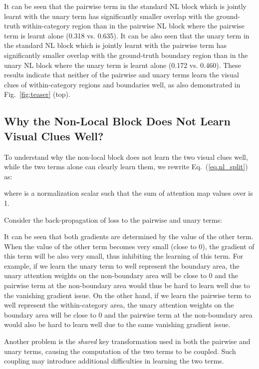 \documentclass[runningheads]{llncs}
\begin{document}
It can be seen that the pairwise term in the standard NL block which is jointly learnt with the unary term has significantly smaller overlap with the ground-truth within-category region than in the pairwise NL block where the pairwise term is learnt alone (0.318 vs. 0.635). It can be also seen that the unary term in the standard NL block which is jointly learnt with the pairwise term has significantly smaller overlap with the ground-truth boundary region than in the unary NL block where the unary term is learnt alone (0.172 vs. 0.460). These results indicate that neither of the pairwise and unary terms learn the visual clues of within-category regions and boundaries well, as also demonstrated in Fig.~\ref{fig:teaser} (top).

\subsection{Why the Non-Local Block Does Not Learn Visual Clues Well?}

To understand why the non-local block does not learn the two visual clues well, while the two terms alone can clearly learn them, we rewrite Eq.~(\ref{eq.nl_split}) as:
\begin{small}

\end{small}where  is a normalization scalar such that the sum of attention map values over  is 1.

Consider the back-propagation of loss  to the pairwise and unary terms:
\begin{small}


\end{small}
It can be seen that both gradients are determined by the value of the other term. When the value of the other term becomes very small (close to 0), the gradient of this term will be also very small, thus inhibiting the learning of this term. For example, if we learn the unary term to well represent the boundary area, the unary attention weights on the non-boundary area will be close to 0 and the pairwise term at the non-boundary area would thus be hard to learn well due to the vanishing gradient issue. On the other hand, if we learn the pairwise term to well represent the within-category area, the unary attention weights on the boundary area will be close to 0 and the pairwise term at the non-boundary area would also be hard to learn well due to the same vanishing gradient issue.

Another problem is the \emph{shared} key transformation  used in both the pairwise and unary terms, causing the computation of the two terms to be coupled. Such coupling may introduce additional difficulties in learning the two terms.
\end{document}
